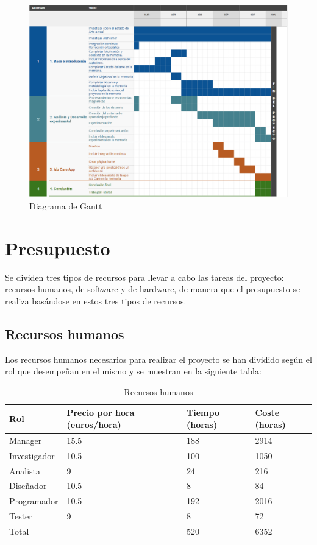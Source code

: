\begin{figure}[H]
    \centering
    \includegraphics[width=\textwidth]{./imgs/diagrama-gantt}
    \caption{Diagrama de Gantt}
    \label{fig:diagrama-gantt}
\end{figure}

\section{Presupuesto}\label{sec:presupuesto}
Se dividen tres tipos de recursos para llevar a cabo las tareas del proyecto: recursos humanos, de software y de
hardware, de manera que el presupuesto se realiza basándose en estos tres tipos de recursos.

\subsection{Recursos humanos}\label{subsec:recursos-humanos}
Los recursos humanos necesarios para realizar el proyecto se han dividido según el rol que desempeñan en el mismo
y se muestran en la siguiente tabla:

\begin{table}[H]
    \centering
    \begin{tabular}{|l|l|l|l|}
        \hline
        \textbf{Rol} & \textbf{Precio por hora (euros/hora)} & \textbf{Tiempo (horas)} & \textbf{Coste (horas)} \\
        \hline
        Manager & 15.5 & 188 & 2914 \\
        \hline
        Investigador & 10.5 & 100 & 1050 \\
        \hline
        Analista & 9 & 24 & 216 \\
        \hline
        Diseñador & 10.5 & 8 & 84 \\
        \hline
        Programador & 10.5 & 192 & 2016 \\
        \hline
        Tester & 9 & 8 & 72 \\
        \hline
        \hline
        Total & & 520 & 6352 \\
        \hline
    \end{tabular}
    \caption{Recursos humanos}
    \label{tab:tabla_recursos_humanos}
\end{table}

